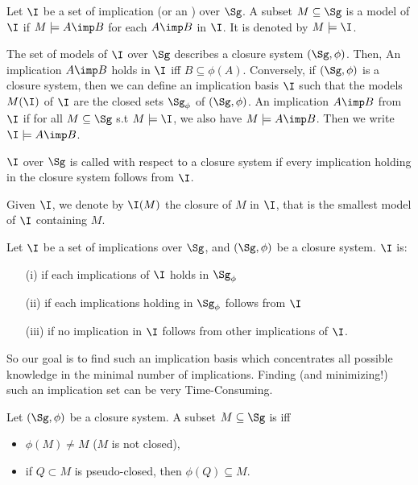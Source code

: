 \begin{definition} Let $\I$ be
a set of implication (or an ) over $\Sg$. A subset
$M \subseteq \Sg$ is a model of $\I$ if $M \models A \imp
B$ for each $A \imp B$ in $\I$. It is denoted by $M \models \I$.
\end{definition}

The set of models of $\I$ over $\Sg$ describes a closure system $(\Sg, \phi)$. 
Then, An implication $A \imp B$ holds in $\I$ iff $B \subseteq \phi(A)$. 
Conversely, if $(\Sg, \phi)$ is a closure system, then we can define an 
implication basis $\I$ such that the models $M(\I)$ of $\I$ are the closed sets
$\Sg_\phi$ of $(\Sg, \phi)$. An implication $A \imp B$  from $\I$ if for all $M \subseteq \Sg$ s.t $M \models \I$, we also have
$M \models A \imp B$. Then we write $\I \models A \imp B$.

\begin{definition} $\I$ over $\Sg$ is called 
 with respect to a closure system if every implication holding
in the closure system follows from $\I$.
	
\end{definition}

Given $\I$, we denote by $\I(M)$ the closure of $M$ in $\I$, that is the 
smallest model of $\I$ containing $M$.

\begin{definition} Let $\I$ be a set of 
implications over $\Sg$, and $(\Sg, \phi)$ be a closure system. $\I$ is:
\begin{itemize}
	\item[(i)]  if each implications of $\I$ holds in $\Sg_\phi$
	\item[(ii)]  if each implications holding in $\Sg_\phi$ 
	follows from $\I$
	\item[(iii)]  if no implication in $\I$ follows from 
	other implications of $\I$.
\end{itemize}
	
\end{definition}

So our goal is to find such an implication basis which concentrates all possible
knowledge in the minimal number of implications. Finding (and minimizing!) such
an implication set can be very Time-Consuming.

\begin{definition} Let $(\Sg, \phi)$ be a closure 
system. A subset $M \subseteq \Sg$ is  iff 
\begin{itemize}
	\item $\phi(M) \neq M$ ($M$ is not closed),
	\item if $Q \subset M$ is pseudo-closed, then $\phi(Q) \subseteq M$.
\end{itemize}

\end{definition}


